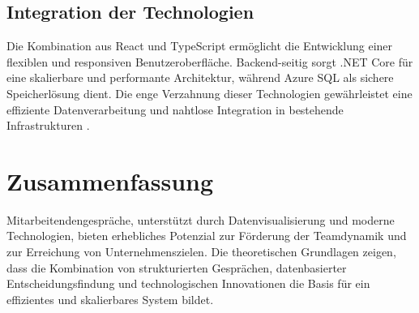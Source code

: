 \subsection*{Integration der Technologien}
Die Kombination aus React und TypeScript ermöglicht die Entwicklung einer flexiblen und responsiven Benutzeroberfläche. Backend-seitig sorgt .NET Core für eine skalierbare und performante Architektur, während Azure SQL als sichere Speicherlösung dient. Die enge Verzahnung dieser Technologien gewährleistet eine effiziente Datenverarbeitung und nahtlose Integration in bestehende Infrastrukturen \cite{microsoftAzure}.

\section{Zusammenfassung}
Mitarbeitendengespräche, unterstützt durch Datenvisualisierung und moderne Technologien, bieten erhebliches Potenzial zur Förderung der Teamdynamik und zur Erreichung von Unternehmenszielen. Die theoretischen Grundlagen zeigen, dass die Kombination von strukturierten Gesprächen, datenbasierter Entscheidungsfindung und technologischen Innovationen die Basis für ein effizientes und skalierbares System bildet.

